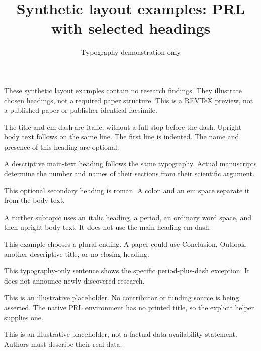 \documentclass[aps,prl,reprint]{revtex4-2}
\begin{document}
\title{Synthetic layout examples: PRL with selected headings}
\author{Typography demonstration only}\noaffiliation
\maketitle
\noindent These synthetic layout examples contain no research findings. They illustrate chosen headings, not a required paper structure. This is a REVTeX preview, not a published paper or publisher-identical facsimile.

The title and em dash are italic, without a full stop before the dash. Upright body text follows on the same line. The first line is indented. The name and presence of this heading are optional.

A descriptive main-text heading follows the same typography. Actual manuscripts determine the number and names of their sections from their scientific argument.

This optional secondary heading is roman. A colon and an em space separate it from the body text.

A further subtopic uses an italic heading, a period, an ordinary word space, and then upright body text. It does not use the main-heading em dash.

This example chooses a plural ending. A paper could use Conclusion, Outlook, another descriptive title, or no closing heading.

This typography-only sentence shows the specific period-plus-dash exception. It does not announce newly discovered research.

\begin{acknowledgments}
This is an illustrative placeholder. No contributor or funding source is being asserted. The native PRL environment has no printed title, so the explicit helper supplies one.
\end{acknowledgments}

This is an illustrative placeholder, not a factual data-availability statement. Authors must describe their real data.
\end{document}
